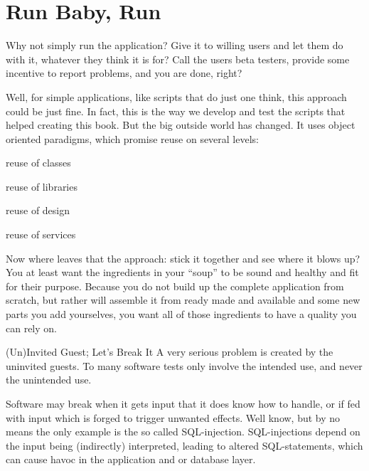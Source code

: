 \documentclass[\docroot/main]{subfiles}
\begin{document}
\chapter{Run Baby, Run}
\begin{wrapfigure}{R}{.4\textwidth}
\end{wrapfigure}
Why not simply run the application?
Give it to willing users and let them do with it, whatever they think it is for?
Call the users beta testers, provide some incentive to report problems, and you are done, right?

Well, for simple applications, like scripts that do just one think,
this approach could be just fine. In fact, this is the way we develop
and test the scripts that helped creating this book. But the big
outside world has changed. It uses object oriented paradigms, which
promise  reuse on several levels:
\begin{multicols}{2}
\begin{itemize*}
\item reuse of classes
\item reuse of libraries
\item reuse of design
\item reuse of services
\end{itemize*}
\end{multicols}
Now where leaves that the approach: stick it together and see where it blows
up? You at least want the ingredients in your ``soup'' to be sound and
healthy and fit for their purpose. Because you do not build up the
complete application from scratch, but rather will assemble it from
ready made and available and some new parts you add yourselves, you
want all of those ingredients to have a quality you can rely on.

\begin{textbox}{(Un)Invited Guest; Let's Break It}%
  A very serious problem is created by the uninvited guests. To many
  software tests only involve the intended use, and never the
  unintended use. 

  Software may break when it gets input that it does know
  how to handle, or if fed with input which is forged to trigger
  unwanted effects. Well know, but by no means the only example is the so called
  SQL-injection. SQL-injections depend
  on the input being (indirectly) interpreted, leading to altered SQL-statements, 
  which can cause havoc in the application and or database layer.
\end{textbox}
\end{document}

